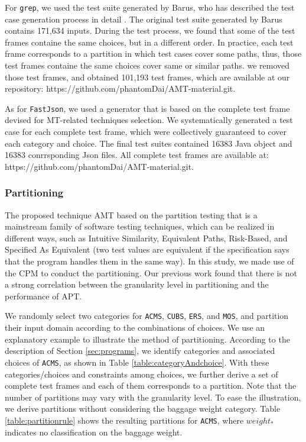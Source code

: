 \documentclass[10pt,journal,compsoc]{IEEEtran}
\begin{document}
For \texttt{grep}, we used the test suite generated by Barus, who has described the test case generation process in detail \cite{barus2016cost}. The original test suite generated by Barus contains 171,634 inputs. During the test process, we found that some of the test frames containe the same choices, but in a different order. In practice, each test frame corresponds to a partition in which test cases cover some paths, thus, those test frames containe the same choices cover same or similar paths. we removed those test frames, and obtained 101,193 test frames, which are available at our repository: https://github.com/phantomDai/AMT-material.git.

As for \texttt{FastJson}, we used a generator that is based on the complete test frame devised for MT-related techniques selection. We systematically generated a test case for each complete test frame, which were collectively guaranteed to cover each category and choice. The final test suites contained 16383 Java object and 16383 conrrsponding Json files. All complete test frames are available at: https://github.com/phantomDai/AMT-material.git.

\subsubsection{Partitioning}
\label{sec:partition}

The proposed technique AMT based on the partition testing that is a mainstream family of software testing techniques, which can be realized in different ways, such as Intuitive Similarity, Equivalent Paths, Risk-Based, and Specified As Equivalent (two test values are equivalent if the specification says that the program handles them in the same way). In this study, we made use of the CPM to conduct the partitioning. Our previous work \cite{sun2018adaptive} found that there is not a strong correlation between the granularity level in partitioning and the performance of APT.

We randomly select two categories for \texttt{ACMS}, \texttt{CUBS}, \texttt{ERS}, and \texttt{MOS}, and partition their input domain according to the combinations of choices. We use an explanatory example to illustrate the method of partitioning. According to the description of Section \ref{sec:programs},  we identify categories and associated choices of \texttt{ACMS}, as shown in Table \ref{table:categoryAndchoice}. With these categories/choices and constraints among choices, we further derive a set of complete test frames and each of them corresponds to a partition. Note that the number of partitions may vary with the granularity level. To ease the illustration, we derive partitions without considering the baggage weight category. Table \ref{table:partitionrule} shows the resulting partitions for \texttt{ACMS}, where $weight_*$ indicates no classification on the baggage weight.
\end{document}
